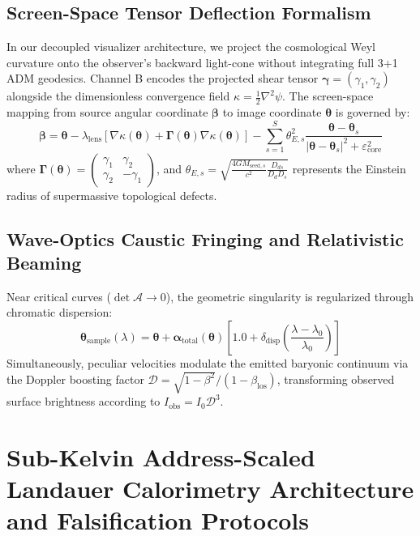 \documentclass[11pt,letterpaper]{article}
\theoremstyle{plain}
\begin{document}
\subsection{Screen-Space Tensor Deflection Formalism}
In our decoupled visualizer architecture, we project the cosmological Weyl
curvature onto the observer's backward light-cone without integrating full
3+1 ADM geodesics. Channel B encodes the projected shear tensor
$\boldsymbol{\gamma} = (\gamma_1, \gamma_2)$ alongside the dimensionless
convergence field $\kappa = \frac{1}{2}\nabla^2\psi$. The screen-space
mapping from source angular coordinate $\boldsymbol{\beta}$ to image
coordinate $\boldsymbol{\theta}$ is governed by:
\begin{equation}
\boldsymbol{\beta} = \boldsymbol{\theta} - \lambda_{\text{lens}} \left[ \nabla \kappa(\boldsymbol{\theta}) + \mathbf{\Gamma}(\boldsymbol{\theta}) \nabla \kappa(\boldsymbol{\theta}) \right] - \sum_{s=1}^{S} \theta_{E,s}^2 \frac{\boldsymbol{\theta} - \boldsymbol{\theta}_s}{|\boldsymbol{\theta} - \boldsymbol{\theta}_s|^2 + \varepsilon_{\text{core}}^2}
\end{equation}
where $\mathbf{\Gamma}(\boldsymbol{\theta}) = \begin{pmatrix} \gamma_1 & \gamma_2 \\ \gamma_2 & -\gamma_1 \end{pmatrix}$, and
$\theta_{E,s} = \sqrt{\frac{4 G M_{\text{seed},s}}{c^2} \frac{D_{ds}}{D_d D_s}}$
represents the Einstein radius of supermassive topological defects.

\subsection{Wave-Optics Caustic Fringing and Relativistic Beaming}
Near critical curves ($\det \mathcal{A} \to 0$), the geometric singularity
is regularized through chromatic dispersion:
\begin{equation}
\boldsymbol{\theta}_{\text{sample}}(\lambda) = \boldsymbol{\theta} + \boldsymbol{\alpha}_{\text{total}}(\boldsymbol{\theta}) \left[ 1.0 + \delta_{\text{disp}} \left( \frac{\lambda - \lambda_0}{\lambda_0} \right) \right]
\end{equation}
Simultaneously, peculiar velocities modulate the emitted baryonic
continuum via the Doppler boosting factor
$\mathcal{D} = \sqrt{1 - \beta^2} / (1 - \beta_{\text{los}})$, transforming
observed surface brightness according to
$I_{\text{obs}} = I_0 \mathcal{D}^3$.


\section{Sub-Kelvin Address-Scaled Landauer Calorimetry Architecture and
Falsification Protocols}
\label{sec:sub-kelvin-address-calorimetry}
\end{document}
